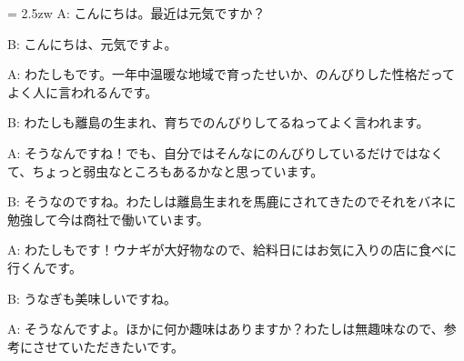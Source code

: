 \documentclass[11pt]{amsart}
\title{}
\author{}
\newenvironment{hangall}[1]{\hangindent = 2.5zw\everypar{\hangindent = 2.5zw}}{}
\begin{document}
\maketitle
\begin{hangall}{}%
A: こんにちは。最近は元気ですか？



B: こんにちは、元気ですよ。



A: わたしもです。一年中温暖な地域で育ったせいか、のんびりした性格だってよく人に言われるんです。



B: わたしも離島の生まれ、育ちでのんびりしてるねってよく言われます。



A: そうなんですね！でも、自分ではそんなにのんびりしているだけではなくて、ちょっと弱虫なところもあるかなと思っています。



B: そうなのですね。わたしは離島生まれを馬鹿にされてきたのでそれをバネに勉強して今は商社で働いています。



A: わたしもです！ウナギが大好物なので、給料日にはお気に入りの店に食べに行くんです。



B: うなぎも美味しいですね。



A: そうなんですよ。ほかに何か趣味はありますか？わたしは無趣味なので、参考にさせていただきたいです。\end{hangall}
\end{document}
